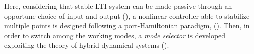{%
%
Here, considering that stable LTI system can be made passive through an opportune choice of input and output (\cite{byrnes91}), a nonlinear controller able to stabilize multiple points is designed following a port-Hamiltonian paradigm, (\cite{876703,secchi2007control,ortega2008control,van2014port}). Then, in order to switch among the working modes, a \textit{mode selector} is developed exploiting the theory of hybrid dynamical systems (\cite{van2000introduction,goebel2008}).


%
}
